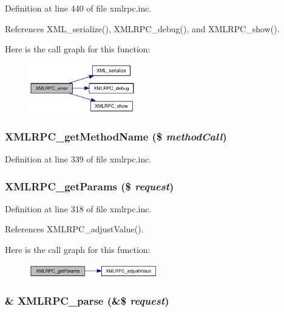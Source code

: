Definition at line 440 of file xmlrpc.inc.

References XML\_\-serialize(), XMLRPC\_\-debug(), and XMLRPC\_\-show().

Here is the call graph for this function:\nopagebreak
\begin{figure}[H]
\begin{center}
\leavevmode
\includegraphics[width=131pt]{xmlrpc_8inc_0cdc54b1376ccbbe412175c9819a95ac_cgraph}
\end{center}
\end{figure}
\hypertarget{xmlrpc_8inc_70efa062e92a380196ed8053850c0906}{
\subsubsection{\setlength{\rightskip}{0pt plus 5cm}XMLRPC\_\-getMethodName (\$ {\em methodCall})}}
\label{xmlrpc_8inc_70efa062e92a380196ed8053850c0906}




Definition at line 339 of file xmlrpc.inc.\hypertarget{xmlrpc_8inc_ce4ea8e1274ca2ee3f51ec5a724f00f3}{
\subsubsection{\setlength{\rightskip}{0pt plus 5cm}XMLRPC\_\-getParams (\$ {\em request})}}
\label{xmlrpc_8inc_ce4ea8e1274ca2ee3f51ec5a724f00f3}




Definition at line 318 of file xmlrpc.inc.

References XMLRPC\_\-adjustValue().

Here is the call graph for this function:\nopagebreak
\begin{figure}[H]
\begin{center}
\leavevmode
\includegraphics[width=159pt]{xmlrpc_8inc_ce4ea8e1274ca2ee3f51ec5a724f00f3_cgraph}
\end{center}
\end{figure}
\hypertarget{xmlrpc_8inc_708b2136ca600664d2207a511b3cf3f8}{
\subsubsection{\setlength{\rightskip}{0pt plus 5cm}\& XMLRPC\_\-parse (\&\$ {\em request})}}
\label{xmlrpc_8inc_708b2136ca600664d2207a511b3cf3f8}




